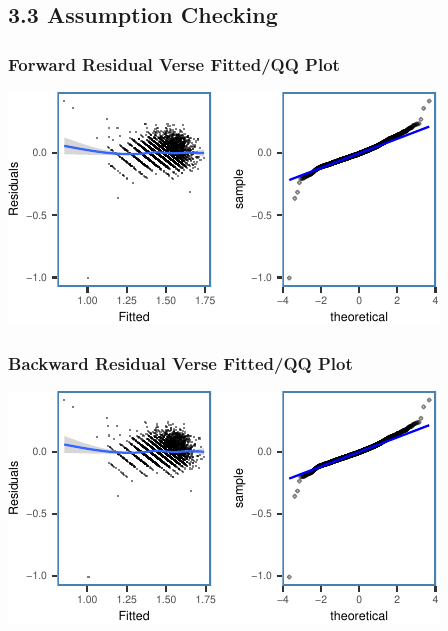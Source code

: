 \documentclass[letterpaper,9pt,twocolumn,twoside,]{pinp}
\begin{document}
\hypertarget{assumption-checking}{%
\subsection{3.3 Assumption Checking}\label{assumption-checking}}

\hypertarget{forward-residual-verse-fittedqq-plot}{%
\subsubsection{Forward Residual Verse Fitted/QQ
Plot}\label{forward-residual-verse-fittedqq-plot}}

\begin{center}\includegraphics{ExecSum_files/figure-latex/unnamed-chunk-4-1} \end{center}

\hypertarget{backward-residual-verse-fittedqq-plot}{%
\subsubsection{Backward Residual Verse Fitted/QQ
Plot}\label{backward-residual-verse-fittedqq-plot}}

\begin{center}\includegraphics{ExecSum_files/figure-latex/unnamed-chunk-5-1} \end{center}
\end{document}
